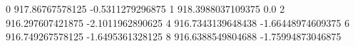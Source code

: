0 917.86767578125 -0.5311279296875
1 918.3988037109375 0.0
2 916.297607421875 -2.1011962890625
4 916.7343139648438 -1.66448974609375
6 916.749267578125 -1.6495361328125
8 916.6388549804688 -1.75994873046875
